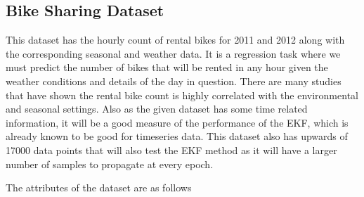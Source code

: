 \documentclass{article}
\begin{document}
\subsection{Bike Sharing Dataset}
This dataset has the hourly count of rental bikes for 2011 and 2012 along with the corresponding seasonal and weather data. It is a regression task where we must predict the number of bikes that will be rented in any hour given the weather conditions and details of the day in question. There are many studies that have shown the rental bike count is highly correlated with the environmental and seasonal settings. Also as the given dataset has some time related information, it will be a good measure of the performance of the EKF, which is already known to be good for timeseries data. This dataset also has upwards of 17000 data points that will also test the EKF method as it will have a larger number of samples to propagate at every epoch.  


The attributes of the dataset are as follows
\end{document}
